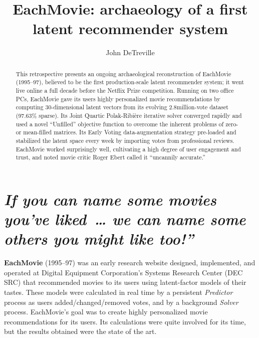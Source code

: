 \documentclass[sigconf,authorversion,screen,microtype={protrusion=true,expansion,kerning,spacing}]{acmart}
\begin{document}
\title{EachMovie: archaeology of a first latent recommender system}
\author{John DeTreville}

\begin{abstract}
This retrospective presents an ongoing archaeological reconstruction of EachMovie (1995--97), believed to be the first production-scale latent recommender system; it went live online a full decade before the Netflix Prize competition. Running on two office PCs, EachMovie gave its users highly personalized movie recommendations by computing 30-dimensional latent vectors from its evolving 2.8\;million-vote dataset (97.63\% sparse). Its Joint Quartic Polak-Ribi\`ere iterative solver converged rapidly and used a novel ``Unfilled'' objective function to overcome the inherent problems of zero- or mean-filled matrices. Its Early Voting data-augmentation strategy pre-loaded and stabilized the latent space every week by importing votes from professional reviews. EachMovie worked surprisingly well, cultivating a high degree of user engagement and trust, and noted movie critic Roger Ebert called it ``uncannily accurate.''
\end{abstract}

\maketitle{}

\section[``If you can name some movies you've liked~\ldots{}'']{\emph{If you can name some movies you've liked~\ldots{} we can name some others you might like too!''}}

\textbf{EachMovie} (1995--97) was an early research website designed, implemented, and operated at Digital Equipment Corporation's Systems Research Center (DEC SRC) that recommended movies to its users using latent-factor models of their tastes. These models were calculated in real time by a persistent \emph{Predictor} process as users added/\allowbreak{}changed/\allowbreak{}removed votes, and by a background \emph{Solver} process. EachMovie's goal was to create highly personalized movie recommendations for its users. Its calculations were quite involved for its time, but the results obtained were the state of the art.
\end{document}
